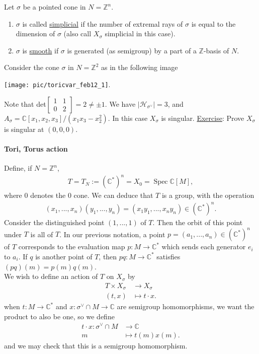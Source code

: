 \documentclass[a4paper,12pt]{amsart}
\newcommand{\ZZ}{\mathbb{Z}}
\newcommand{\CC}{\mathbb{C}}
\DeclareMathOperator{\Spec}{Spec}
\begin{document}
\begin{Def}
Let $\sigma$ be a pointed cone in $N = \ZZ^n$. 
\begin{enumerate}
	\item $\sigma$ is called \underline{simplicial} if the number of extremal rays of $\sigma$ is equal to the dimension of $\sigma$ (also call $X_\sigma$ simplicial in this case).
	\item $\sigma$ is \underline{smooth} if $\sigma$ is generated (as semigroup) by a part of a $\ZZ$-basis of $N$.
\end{enumerate}
\end{Def}

\begin{Eg}
Consider the cone $\sigma$ in $N = \ZZ^2$ as in the following image
\begin{center}
	\texttt{[image: pic/toricvar\_feb12\_1]}.
\end{center}
Note that det$\begin{bmatrix}
1 & 1 \\
0 & 2 
\end{bmatrix} = 2 \neq \pm 1$. We have $|\mathcal{H}_{\sigma^\vee}| = 3$, and $A_\sigma = \CC[x_1, x_2, x_3] / (x_1 x_3 - x_2^2)$. In this case $X_\sigma$ is singular. \underline{Exercise}: Prove $X_\sigma$ is singular at $(0,0,0)$.	
\end{Eg}


\paragraph{Tori, Torus action}
Define, if $N = \ZZ^n$, 
\begin{align*}
	T = T_N := (\CC^*)^n = X_0 = \Spec \CC[M],
\end{align*}
where $0$ denotes the $0$ cone. We can deduce that $T$ is a group, with the operation 
\begin{align*}
	(x_1, ..., x_n)(y_1, ..., y_n) = (x_1 y_1, ... , x_n y_n) \in (\CC^*)^n.
\end{align*}
Consider the distinguished point $(1, ..., 1)$ of $T$. Then the orbit of this point under $T$ is all of $T$. In our previous notation, a point $p = (a_1, ..., a_n) \in (\CC^*)^n$ of $T$ corresponds to the evaluation map $p: M \to \CC^*$ which sends each generator $e_i$ to $a_i$. If $q$ is another point of $T$, then $pq: M \to \CC^*$ satisfies $(pq)(m) = p(m) q(m)$. \\

We wish to define an action of $T$ on $X_\sigma$ by 
\begin{align*}
	T \times X_\sigma &\to X_\sigma \\
	(t,x) &\mapsto t \cdot x.
\end{align*}
when $t: M \to \CC^*$ and $x: \sigma^\vee \cap M \to \CC$ are semigroup homomorphisms, we want the product to also be one, so we define
\begin{align*}
		t \cdot x: \sigma^\vee \cap M &\to \CC \\
	m &\mapsto t(m) x(m).
\end{align*}
and we may check that this is a semigroup homomorphism.
\end{document}
